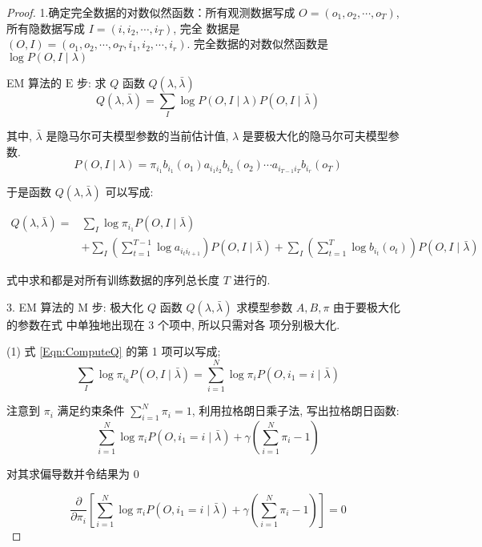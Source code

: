 \begin{proof}
    1.确定完全数据的对数似然函数：所有观测数据写成 $ O=\left(o_{1}, o_{2}, \cdots, o_{T}\right) $, 所有隐数据写成 $ I=\left(i, i_{2}, \cdots, i_{T}\right) $, 完全 数据是 $ (O, I)=\left(o_{1}, o_{2}, \cdots, o_{T}, i_{1}, i_{2}, \cdots, i_{r}\right) . $ 完全数据的对数似然函数是 $ \log P(O, I \mid \lambda) $


EM 算法的 $ \mathrm{E} $ 步: 求 $ Q $ 函数 $ Q(\lambda, \bar{\lambda}) $
$$
Q(\lambda, \bar{\lambda})=\sum_{I} \log P(O, I \mid \lambda) P(O, I \mid \bar{\lambda})
$$

其中, $ \bar{\lambda} $ 是隐马尔可夫模型参数的当前估计值, $ \lambda $ 是要极大化的隐马尔可夫模型参数.
$$ P(O, I \mid \lambda)=\pi_{i_{1}} b_{i_{1}}\left(o_{1}\right) a_{i_1 i_{2}} b_{i_{2}}\left(o_{2}\right) \cdots a_{i_{T-1} i_{T}} b_{i_{r}}\left(o_{T}\right) $$

于是函数 $ Q(\lambda, \bar{\lambda}) $ 可以写成:

\begin{equation}
    \label{Eqn:ComputeQ}
\begin{aligned}
Q(\lambda, \bar{\lambda})=& \sum_{I} \log \pi_{i_1} P(O, I \mid \bar{\lambda}) \\
&+\sum_{I}\left(\sum_{t=1}^{T-1} \log a_{i_t i_{t+1}}\right) P(O, I \mid \bar{\lambda})+\sum_{I}\left(\sum_{t=1}^{T} \log b_{i_{t}}\left(o_{t}\right)\right) P(O, I \mid \bar{\lambda})
\end{aligned}
\end{equation}


式中求和都是对所有训练数据的序列总长度 $ T $ 进行的.


3. EM 算法的 $ \mathrm{M} $ 步: 极大化 $ Q $ 函数 $ Q(\lambda, \bar{\lambda}) $ 求模型参数 $ A, B, \pi $ 由于要极大化的参数在式 中单独地出现在 3 个项中, 所以只需对各 项分别极大化.

(1) 式 \ref{Eqn:ComputeQ} 的第 1 项可以写成;
$$
\sum_{I} \log \pi_{i_{0}} P(O, I \mid \bar{\lambda})=\sum_{i=1}^{N} \log \pi_{i} P\left(O, i_{1}=i \mid \bar{\lambda}\right)
$$

注意到 $ \pi_{i} $ 满足约束条件 $ \sum_{i=1}^{N} \pi_{i}=1 $, 利用拉格朗日乘子法, 写出拉格朗日函数:
$$
\sum_{i=1}^{N} \log \pi_{i} P\left(O, i_{1}=i \mid \bar{\lambda}\right)+\gamma\left(\sum_{i=1}^{N} \pi_{i}-1\right)
$$

对其求偏导数并令结果为 0


\begin{equation}
    \label{Eqn:PartialDerivativeOfLagrange}
    \frac{\partial}{\partial \pi_{i}}\left[\sum_{i=1}^{N} \log \pi_{i} P\left(O, i_{1}=i \mid \bar{\lambda}\right)+\gamma\left(\sum_{i=1}^{N} \pi_{i}-1\right)\right]=0
\end{equation}



\end{proof}
